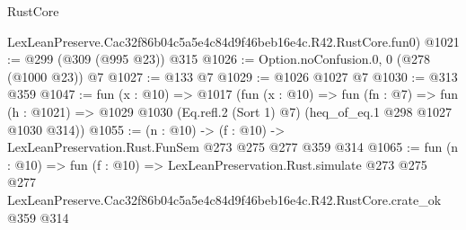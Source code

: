 \begin{lexlean}{RustCore}
\begin{coremodule}
    LexLeanPreserve.Cac32f86b04c5a5e4c84d9f46beb16e4c.R42.RustCore.fun0)
@1021 := @299 (@309 (@995 @23)) @315
@1026 := Option.noConfusion.{0, 0} (@278 (@1000 @23)) @7
@1027 := @133 @7
@1029 := @1026 @1027 @7
@1030 := @313 @359
@1047 := fun (x : @10) =>
  @1017
    (fun (x : @10) =>
    fun (fn : @7) =>
    fun (h : @1021) => @1029 @1030 (Eq.refl.{2} (Sort 1) @7) (heq_of_eq.{1} @298 @1027 @1030 @314))
@1055 := (n : @10) -> (f : @10) -> LexLeanPreservation.Rust.FunSem @273 @275 @277 @359 @314
@1065 := fun (n : @10) =>
  fun (f : @10) =>
  LexLeanPreservation.Rust.simulate
    @273
    @275
    @277
    LexLeanPreserve.Cac32f86b04c5a5e4c84d9f46beb16e4c.R42.RustCore.crate_ok
    @359
    @314
\end{coremodule}
\end{lexlean}
